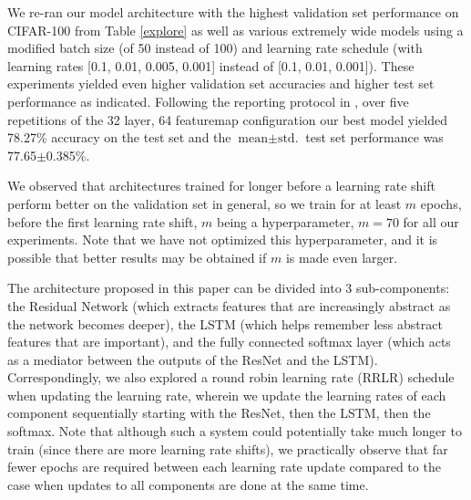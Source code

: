 \documentclass{article}
\begin{document}
We re-ran our model architecture with the highest validation set performance on CIFAR-100 from Table \ref{explore} as well as various extremely wide models %
using a modified batch size (of 50 instead of 100) and learning rate schedule (with learning rates [0.1, 0.01, 0.005, 0.001] instead of [0.1, 0.01, 0.001]). These experiments yielded even higher validation set accuracies and higher test set performance as indicated. Following the reporting protocol in \cite{he2015deep}, over five repetitions of the 32 layer, 64 featuremap configuration our best model yielded 78.27\% accuracy on the test set and the $\textrm{mean} \pm{\textrm{std.}}$ test set performance was 77.65$\pm${0.385}\%.

We observed that architectures trained for longer before a learning rate shift perform better on the validation set in general, so we train for at least $m$ epochs, before the first learning rate shift, $m$ being a hyperparameter, $m=70$ for all our experiments. Note that we have not optimized this hyperparameter, and it is possible that better results may be obtained if $m$ is made even larger.

The architecture proposed in this paper can be divided into 3 sub-components: the Residual Network (which extracts features that are increasingly abstract as the network becomes deeper), the LSTM (which helps remember less abstract features that are important), and the fully connected softmax layer (which acts as a mediator between the outputs of the ResNet and the LSTM). Correspondingly, we also explored a round robin learning rate (RRLR) schedule when updating the learning rate, wherein we update the learning rates of each component sequentially starting with the ResNet, then the LSTM, then the softmax. Note that although such a system could potentially take much longer to train (since there are more learning rate shifts), we practically observe that far fewer epochs are required between each learning rate update compared to the case when updates to all components are done at the same time.
\end{document}
